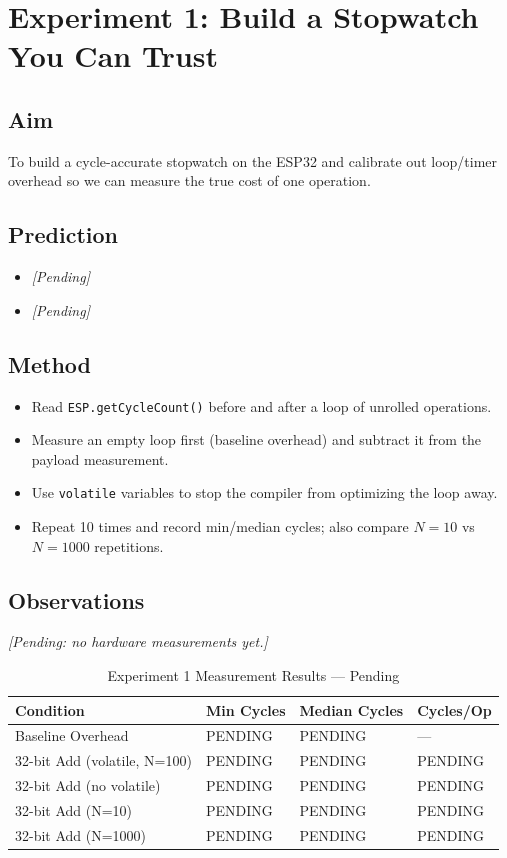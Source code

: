 \section{Experiment 1: Build a Stopwatch You Can Trust}

\subsection{Aim}
To build a cycle-accurate stopwatch on the ESP32 and calibrate out loop/timer overhead so we can measure the true cost of one operation.

\subsection{Prediction}
\begin{itemize}[noitemsep]
    \item \textit{[Pending]}
    \item \textit{[Pending]}
\end{itemize}

\subsection{Method}
\begin{itemize}[noitemsep]
    \item Read \texttt{ESP.getCycleCount()} before and after a loop of unrolled operations.
    \item Measure an empty loop first (baseline overhead) and subtract it from the payload measurement.
    \item Use \texttt{volatile} variables to stop the compiler from optimizing the loop away.
    \item Repeat 10 times and record min/median cycles; also compare $N=10$ vs $N=1000$ repetitions.
\end{itemize}

\subsection{Observations}
\textit{[Pending: no hardware measurements yet.]}

\begin{table}[htbp]
\centering
\caption{Experiment 1 Measurement Results --- Pending}
\label{tab:exp1_obs}
\small
\begin{tabularx}{\textwidth}{l X X X}
\toprule
\textbf{Condition} & \textbf{Min Cycles} & \textbf{Median Cycles} & \textbf{Cycles/Op} \\
\midrule
Baseline Overhead & PENDING & PENDING & --- \\
32-bit Add (volatile, N=100) & PENDING & PENDING & PENDING \\
32-bit Add (no volatile) & PENDING & PENDING & PENDING \\
32-bit Add (N=10) & PENDING & PENDING & PENDING \\
32-bit Add (N=1000) & PENDING & PENDING & PENDING \\
\bottomrule
\end{tabularx}
\end{table}

